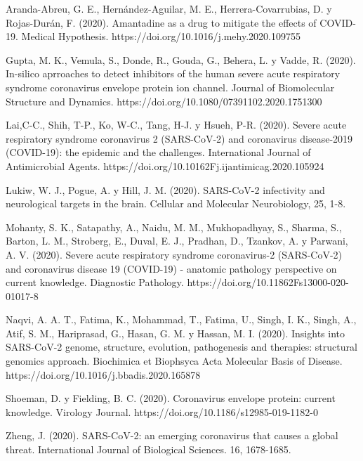 \documentclass[titlepage, 12pt]{article}
\begin{document}
Aranda-Abreu, G. E., Hernández-Aguilar, M. E., Herrera-Covarrubias, D. y Rojas-Durán, F. (2020). Amantadine as a drug to mitigate the effects of COVID-19. Medical Hypothesis. https://doi.org/10.1016/j.mehy.2020.109755

Gupta, M. K., Vemula, S., Donde, R., Gouda, G., Behera, L. y Vadde, R. (2020). In-silico aprroaches to detect inhibitors of the human severe acute respiratory syndrome coronavirus envelope protein ion channel. Journal of Biomolecular Structure and Dynamics. https://doi.org/10.1080/07391102.2020.1751300

Lai,C-C., Shih, T-P., Ko, W-C., Tang, H-J. y Hsueh, P-R. (2020). 
Severe acute respiratory syndrome coronavirus 2 (SARS-CoV-2) and coronavirus disease-2019 (COVID-19): the epidemic and the challenges. 
International Journal of Antimicrobial Agents.
https://doi.org/10.10162Fj.ijantimicag.2020.105924

Lukiw, W. J., Pogue, A. y Hill, J. M. (2020). SARS-CoV-2 infectivity and neurological targets in the brain. Cellular and Molecular Neurobiology, 25, 1-8.

Mohanty, S. K., Satapathy, A., Naidu, M. M., Mukhopadhyay, S., Sharma, S., Barton, L. M., Stroberg, E., Duval, E. J., Pradhan, D., Tzankov, A. y Parwani, A. V. (2020). Severe acute respiratory syndrome coronavirus-2 (SARS-CoV-2) and coronavirus disease 19 (COVID-19) - anatomic pathology perspective on current knowledge. Diagnostic Pathology.
https://doi.org/10.11862Fs13000-020-01017-8

Naqvi, A. A. T., Fatima, K., Mohammad, T., Fatima, U., Singh, I. K., Singh, A., Atif, S. M., Hariprasad, G., Hasan, G. M. y Hassan, M. I. (2020). Insights into SARS-CoV-2 genome, structure, evolution, pathogenesis and therapies: structural genomics approach. Biochimica et Biophsyca Acta Molecular Basis of Disease. https://doi.org/10.1016/j.bbadis.2020.165878

Shoeman, D. y Fielding, B. C. (2020). Coronavirus envelope protein: current knowledge. Virology Journal. https://doi.org/10.1186/s12985-019-1182-0

Zheng, J. (2020). SARS-CoV-2: an emerging coronavirus that causes a global threat. International Journal of Biological Sciences. 16, 1678-1685.
\end{document}
